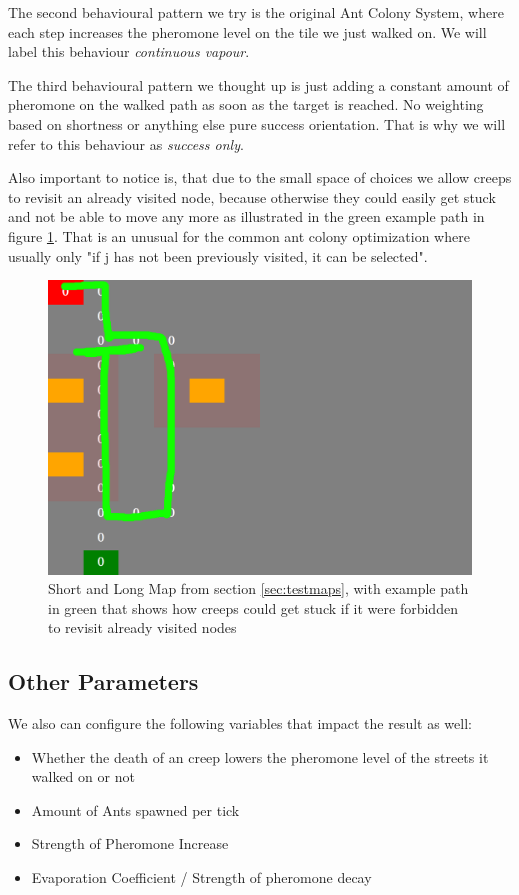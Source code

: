 The second behavioural pattern we try is the original Ant Colony System\cite{maniezzo2002ant}, where each step increases the pheromone level on the tile we just walked on. We will label this behaviour \textit{continuous vapour}.

The third behavioural pattern we thought up is just adding a constant amount of pheromone on the walked path as soon as the target is reached. No weighting based on shortness or anything else pure success orientation. That is why we will refer to this behaviour as \textit{success only}.

Also important to notice is, that due to the small space of choices we allow creeps to revisit an already visited node, because otherwise they could easily get stuck  and not be able to move any more as illustrated in the green example path in figure \ref{fig:gettingstuck}. That is an unusual for the common ant colony optimization where usually only "if j has  not  been  previously  visited,  it  can  be  selected"\cite{dorigo2006ant}.

\begin{figure}[H]
  \centering
  \includegraphics[width=1\linewidth]{images/map_shortlong_deadend}
  \caption{Short and Long Map from section \ref{sec:testmaps}, with example path in green that shows how creeps could get stuck if it were forbidden to revisit already visited nodes}
  \label{fig:gettingstuck}
\end{figure}

\subsection{Other Parameters}
\label{sec:otherparamas}
We also can configure the following variables that impact the result as well:
\begin{itemize}
\item  Whether the death of an creep lowers the pheromone level of the streets it walked on or not
\item Amount of Ants spawned per tick
\item Strength of Pheromone Increase
\item Evaporation Coefficient / Strength of pheromone decay
\end{itemize}

